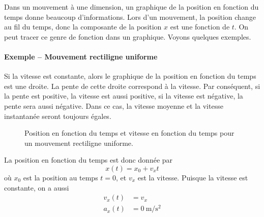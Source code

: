 Dans un mouvement à une dimension, un graphique de la position en fonction du
temps donne beaucoup d'informations.  Lors d'un mouvement, la position change
au fil du temps, donc la composante de la position $x$ est une fonction de $t$.
On peut tracer ce genre de fonction dans un graphique.  Voyons quelques
exemples.

\paragraph{Exemple -- Mouvement rectiligne uniforme}
Si la vitesse est constante, alors le graphique de la position en fonction du
temps est une droite.  La pente de cette droite correspond à la vitesse.  Par
conséquent, si la pente est positive, la vitesse est aussi positive, si la
vitesse est négative, la pente sera aussi négative.  Dans ce cas, la vitesse
moyenne et la vitesse instantanée seront toujours égales.
\begin{figure}
  \label{fig:mru}
  \caption{Position en fonction du temps et vitesse en fonction du temps pour
    un mouvement rectiligne uniforme.}
\end{figure}

La position en fonction du temps est donc donnée par
\[
  x(t) = x_0 + v_xt
\]
où $x_0$ est la position au temps $t = 0$, et $v_x$ est la vitesse.  Puisque la
vitesse est constante, on a aussi
\begin{align*}
  v_x(t) &= v_x \\
  a_x(t) &= \SI{0}{\meter\per\second\squared}
\end{align*}


